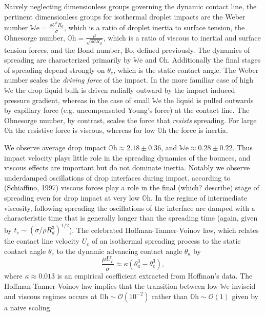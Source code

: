 \documentclass[12pt,a4paper,oneside]{book}
\begin{document}
Naively neglecting dimensionless groups governing the dynamic contact line, the pertinent dimensionless groups for isothermal droplet impacts are the Weber number $\mathbb{W}\mbox{e} = \frac{\rho U^2 R_d}{\sigma}$, which is a ratio of droplet inertia to surface tension, the Ohnesorge number, $\mathbb{O}\mbox{h} = \frac{\mu}{\sqrt{\rho \sigma R_d}}$, which is a ratio of viscous to inertial and surface tension forces, and the Bond number, $\mathbb{B}\mbox{o}$, defined previously. The dynamics of spreading are characterized primarily by $\mathbb{W}\mbox{e}$ and $\mathbb{O}\mbox{h}$. Additionally the final stages of spreading depend strongly on $\theta_e$, which is the static contact angle. The Weber number scales the \emph{driving force} of the impact. In the more familiar case of high $\mathbb{W}\mbox{e}$ the drop liquid bulk is driven radially outward by the impact induced pressure gradient, whereas in the case of small $\mathbb{W}\mbox{e}$ the liquid is pulled outwards by capillary force (e.g. uncompensated Young's force) at the contact line. The Ohnesorge number, by contrast, scales the force that \emph{resists} spreading. For large $\mathbb{O}\mbox{h}$ the resistive force is viscous, whereas for low $\mathbb{O}\mbox{h}$ the force is inertia.

We observe average drop impact $\mathbb{O}\mbox{h} \approx 2.18 \pm 0.36$, and  $\mathbb{W}\mbox{e} \approx 0.28 \pm 0.22$. Thus impact velocity plays little role in the spreading dynamics of the bounces, and viscous effects are important but do not dominate inertia. Notably we observe underdamped oscillations of drop interfaces during impact. according to (Schiaffino, 1997) viscous forces play a role in the final (which? describe) stage of spreading even for drop impact at very low $\mathbb{O}\mbox{h}$. In the regime of intermediate viscosity, following spreading the oscillations of the interface are damped with a characteristic time that is generally longer than the spreading time (again, given by $t_c \sim \left( \sigma / \rho R_d^3 \right)^{1/2}$). The celebrated Hoffman-Tanner-Voinov law, which relates the contact line velocity $U_c$ of an isothermal spreading process to the static contact angle $\theta_e$ to the dynamic advancing contact angle $\theta_a$ by
\[
\frac{\mu U_c}{\sigma} \approx \kappa \left( \theta_a^3 - \theta_e^3 \right),
\]
where $\kappa \approx 0.013$ is an empirical coefficient extracted from Hoffman's data. The Hoffman-Tanner-Voinov law implies that the transition between low $\mathbb{W}\mbox{e}$ inviscid and viscous regimes occurs at $\mathbb{O}\mbox{h} \sim \mathcal{O}(10^{-2})$ rather than $\mathbb{O}\mbox{h} \sim \mathcal{O}(1)$ given by a naive scaling.
\end{document}
